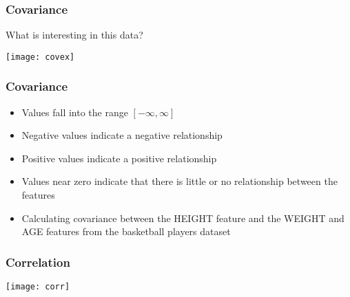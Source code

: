 \begin{frame}[fragile] \frametitle{Covariance}

What is interesting in this data?

\begin{center}
\texttt{[image: covex]}
\end{center}

\end{frame}


\begin{frame}[fragile] \frametitle{Covariance}

\begin{itemize}
\item Values fall into the range $[- \infty, \infty]$
\item Negative values indicate a negative relationship
\item Positive values indicate a positive relationship
\item Values near zero indicate that there is little or no relationship between the features
\item Calculating covariance between the HEIGHT feature and the WEIGHT and AGE features from the basketball players dataset
\end{itemize}

\end{frame}


\begin{frame}[fragile] \frametitle{Correlation}

\begin{center}
\texttt{[image: corr]}
\end{center}
\end{frame}



